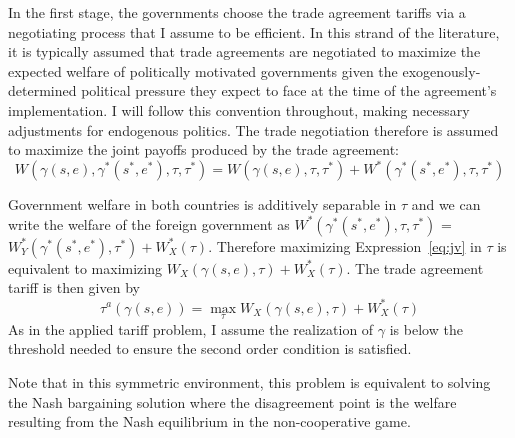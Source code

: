 \documentclass[12pt]{article}
\newcommand{\ga}{\gamma}
\begin{document}
In the first stage, the governments choose the trade agreement tariffs via a negotiating process that I assume to be efficient. In this strand of the literature, it is typically assumed that trade agreements are negotiated to maximize the expected welfare of politically motivated governments given the exogenously-determined political pressure they expect to face at the time of the agreement's implementation. I will follow this convention throughout, making necessary adjustments for endogenous politics. The trade negotiation therefore is assumed to maximize the joint payoffs produced by the trade agreement:
\begin{equation}
  W(\ga(s,e),\ga^*(s^*,e^*),\tau,\tau^*) = W(\ga(s,e),\tau,\tau^*) + W^*(\ga^*(s^*,e^*),\tau,\tau^*)
  \label{eq:jv}
\end{equation}

Government welfare in both countries is additively separable in $\tau$ and we can write the welfare of the foreign government as $W^*(\ga^*(s^*,e^*),\tau,\tau^*)$ = $W_Y^*(\ga^*(s^*,e^*),\tau^*) + W_X^*(\tau)$. Therefore maximizing Expression~\ref{eq:jv} in $\tau$ is equivalent to maximizing $W_X(\ga(s,e),\tau) + W_X^*(\tau)$. The trade agreement tariff is then given by
\begin{equation}
  \tau^a(\ga(s,e)) = \max_\tau W_X(\ga(s,e),\tau) + W_X^*(\tau)
  \label{eq:eff}
\end{equation}
As in the applied tariff problem, I assume the realization of $\ga$ is below the threshold needed to ensure the second order condition is satisfied.

Note that in this symmetric environment, this problem is equivalent to solving the Nash bargaining solution where the disagreement point is the welfare resulting from the Nash equilibrium in the non-cooperative game.
\end{document}
